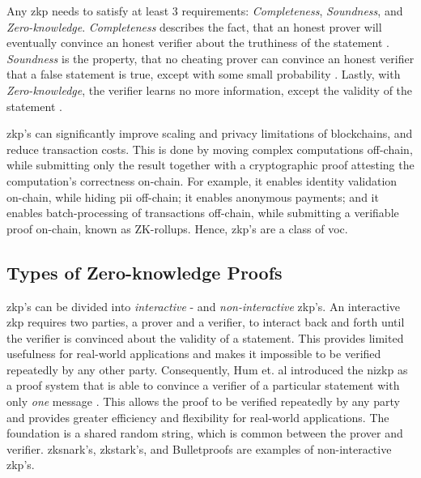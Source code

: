 Any \acrshort{zkp} needs to satisfy at least 3 requirements: \emph{Completeness}, \emph{Soundness}, and \emph{Zero-knowledge}. \emph{Completeness} describes the fact, that an honest prover will eventually convince an honest verifier about the truthiness of the statement \cite{simunicVerifiableComputingApplications2021}. \emph{Soundness} is the property, that no cheating prover can convince an honest verifier that a false statement is true, except with some small probability \cite{simunicVerifiableComputingApplications2021}. Lastly, with \emph{Zero-knowledge}, the verifier learns no more information, except the validity of the statement \cite{simunicVerifiableComputingApplications2021}.

\acrshort{zkp}'s can significantly improve scaling and privacy limitations of blockchains, and reduce transaction costs. This is done by moving complex computations off-chain, while submitting only the result together with a cryptographic proof attesting the computation's correctness on-chain. For example, it enables identity validation on-chain, while hiding \acrshort{pii} off-chain; it enables anonymous payments; and it enables batch-processing of transactions off-chain, while submitting a verifiable proof on-chain, known as ZK-rollups. Hence, \acrshort{zkp}'s are a class of \acrfull{voc}.

\subsection{Types of Zero-knowledge Proofs}
\label{subsec:zkp_req}

\acrlong{zkp}'s can be divided into \emph{interactive} - and \emph{non-interactive} \acrshort{zkp}'s. An interactive \acrshort{zkp} requires two parties, a prover and a verifier, to interact back and forth until the verifier is convinced about the validity of a statement. This provides limited usefulness for real-world applications and makes it impossible to be verified repeatedly by any other party. Consequently, Hum et. al \cite{humZeroKnowledgeItsApplications} introduced the \acrfull{nizkp} as a proof system that is able to convince a verifier of a particular statement with only \emph{one} message \cite{eberhardtOffchainingModelsApproaches2018,eberhardtZoKratesScalablePrivacyPreserving2018a,simunicVerifiableComputingApplications2021}. This allows the proof to be verified repeatedly by any party and provides greater efficiency and flexibility for real-world applications. The foundation is a shared random string, which is common between the prover and verifier. \acrshort{zksnark}'s, \acrshort{zkstark}'s, and Bulletproofs are examples of non-interactive \acrshort{zkp}'s.


